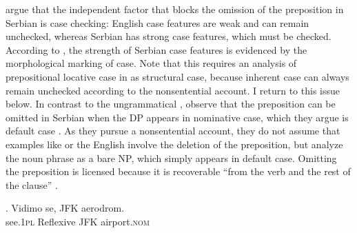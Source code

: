 \citet{barton.progovac2005} argue that the independent factor that blocks the omission of the preposition in Serbian is case checking: English case features are weak and can remain unchecked, whereas Serbian has strong case features, which must be checked. According to \citeauthor{barton.progovac2005}, the strength of Serbian case features is evidenced by the morphological marking of case. Note that this requires an analysis of prepositional locative case in \Last[b] as structural case, because inherent case can always remain unchecked according to the nonsentential account. I return to this issue below. In contrast to the ungrammatical \Last[b], \citeauthor{barton.progovac2005} observe that the preposition can be omitted in Serbian when the DP appears in nominative case, which they argue is default case \Next. As they pursue a nonsentential account, they do not assume that examples like \Next or the English \Last[a] involve the deletion of the preposition, but analyze the noun phrase as a bare NP, which simply appears in default case. Omitting the preposition is licensed because it is recoverable ``from the verb and the rest of the clause'' \citep[89]{barton.progovac2005}.\largerpage[2]

\exg. Vidimo se, JFK aerodrom.  \\
see.\textsc{1pl} Reflexive  JFK airport.\textsc{nom}\\
 

